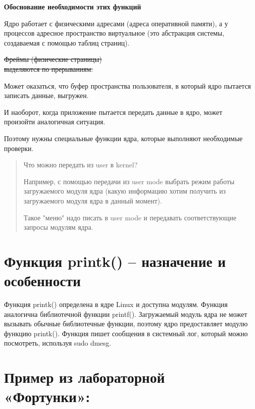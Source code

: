 \textbf{Обоснование необходимости этих функций}

Ядро работает с физическими адресами (адреса оперативной памяти), а у процессов адресное пространство виртуальное (это абстракция системы, создаваемая с помощью таблиц страниц).

\sout{Фреймы (физические страницы) \\ выделяются по прерываниям.}

Может оказаться, что буфер пространства пользователя, в который ядро пытается записать данные, выгружен.

И наоборот, когда приложение пытается передать данные в ядро, может произойти аналогичная ситуация.

Поэтому нужны специальные функции ядра, которые выполняют необходимые проверки.

\begin{quote}
Что можно передать из user в kernel?

Например, с помощью передачи из user mode выбрать режим работы загружаемого модуля ядра (какую информацию хотим получить из загружаемого модуля ядра в данный момент).

Такое "меню" надо писать в user mode и передавать соответствующие запросы модулям ядра.
\end{quote}

\section{Функция printk() – назначение и особенности}
Функция printk() определена в ядре Linux и доступна модулям. Функция аналогична библиотечной функции printf(). Загружаемый модуль ядра не может вызывать обычные библиотечные функции, поэтому ядро предоставляет модулю функцию printk(). Функция пишет сообщения в системный лог, который можно посмотреть, используя sudo dmesg.

\section*{Пример из лабораторной «Фортунки»:}

